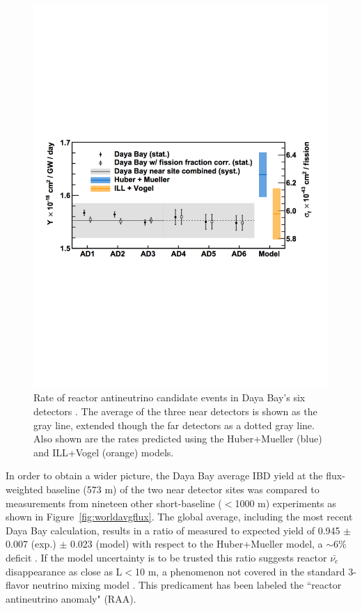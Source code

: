 \begin{figure}[h]
	\centering
	\includegraphics[width=0.7\linewidth]{tex/3-reactorneutrinos-images/DayaBayFlux}
	\caption[Daya Bay $\bar{\nu_{e}}$ flux.]{Rate of reactor antineutrino candidate events in Daya Bay's six detectors \cite{DayaBayAnomaly}. The average of the three near detectors is shown as the gray line, extended though the far detectors as a dotted gray line. Also shown are the rates predicted using the Huber+Mueller (blue) and ILL+Vogel (orange) models.}
	\label{fig:dayabayflux}
\end{figure}

In order to obtain a wider picture, the Daya Bay average IBD yield at the flux-weighted baseline (573 m) of the two near detector sites was compared to measurements from nineteen other short-baseline ($<$1000 m) experiments as shown in Figure~\ref{fig:worldavgflux}. 
The global average, including the most recent Daya Bay calculation, results in a ratio of measured to expected yield of 0.945 $\pm$ 0.007 (exp.) $\pm$ 0.023 (model) with respect to the Huber+Mueller model, a $\sim$6\% deficit \cite{DayaBayFlux2018}.
If the model uncertainty is to be trusted this ratio suggests reactor $\bar{\nu_{e}}$ disappearance as close as L$<$10 m, a phenomenon not covered in the standard 3-flavor neutrino mixing model \cite{HayesVogel}.  
This predicament has been labeled the ``reactor antineutrino anomaly" (RAA). 

